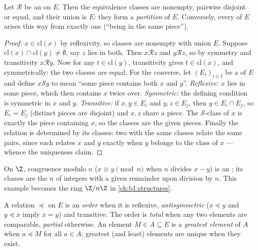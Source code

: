 \begin{theorem}\label{thm:b1:logic:partition}
Let $\mathcal{R}$ be an  on $E$. Then the
equivalence classes are nonempty, pairwise disjoint or equal, and their
union is $E$: they form a \emph{partition} of $E$.
Conversely, every  of $E$ arises this way from exactly one
 (``being in the same piece'').
\end{theorem}

\begin{proof}
$x \in \mathrm{cl}(x)$ by reflexivity, so classes are nonempty with
union $E$. Suppose $\mathrm{cl}(x) \cap \mathrm{cl}(y) \neq \emptyset$,
say $z$ lies in both. Then $x \mathbin{\mathcal{R}} z$ and $y
\mathbin{\mathcal{R}} z$, so by symmetry and transitivity $x
\mathbin{\mathcal{R}} y$. Now for any $t \in \mathrm{cl}(y)$,
transitivity gives $t \in \mathrm{cl}(x)$, and symmetrically: the two
classes are equal. For the converse, let $(E_i)_{i \in I}$ be a
 of $E$ and define $x \mathbin{\mathcal S} y$ to mean
``some piece contains both $x$ and $y$''. \emph{Reflexive:} $x$
lies in some piece, which then contains $x$ twice over.
\emph{Symmetric:} the defining condition is symmetric in $x$ and
$y$. \emph{Transitive:} if $x, y \in E_i$ and $y, z \in E_j$, then
$y \in E_i \cap E_j$, so $E_i = E_j$ (distinct pieces are
disjoint) and $x, z$ share a piece. The $\mathcal S$-class of $x$
is exactly the piece containing $x$, so the classes are the given
pieces. Finally the relation is determined by its classes: two
 with the same classes relate the same pairs,
since each relates $x$ and $y$ exactly when $y$ belongs to the
class of $x$ --- whence the uniqueness claim.
\end{proof}

\begin{example}\label{ex:b1:logic:congruence}
On $\Z$, congruence modulo $n$ ($x \equiv y \pmod n$ when $n$ divides
$x - y$) is an ; its classes are the $n$  of
integers with a given remainder upon division by $n$. This example
becomes the ring $\Z/n\Z$ in \cref{ch:b1:structures}.
\end{example}

\begin{definition}\label{def:b1:logic:order}
A relation $\preceq$ on $E$ is an \emph{order}
when it is reflexive, \emph{antisymmetric} ($x \preceq y$ and $y
\preceq x$ imply $x = y$) and transitive. The order is \emph{total}
when any two elements are comparable, \emph{partial} otherwise. An
element $M \in A \subseteq E$ is a \emph{greatest element} of $A$ when
$a \preceq M$ for all $a \in A$; greatest (and least) elements are
unique when they exist.
\end{definition}

